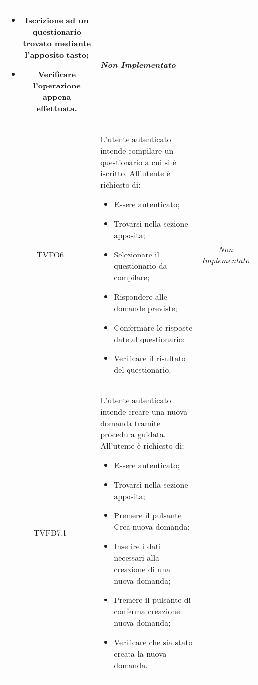 \begin{longtable}[ht]{|c|>{}m{8cm}|c|}
\begin{itemize}
\item Iscrizione ad un questionario trovato mediante l’apposito tasto;
\item Verificare l'operazione appena effettuata.
\end{itemize}
 & \textit{Non Implementato}\\ \hline
\hypertarget{TVFO6}{TVFO6} & L’utente autenticato  intende compilare un questionario a cui si è  iscritto. All’utente è richiesto di:
\begin{itemize}
\item Essere autenticato;
\item Trovarsi nella sezione apposita;
\item Selezionare il questionario da compilare;
\item Rispondere alle domande previste;
\item Confermare le risposte date al questionario;
\item Verificare il risultato del questionario.
\end{itemize}
 & \textit{Non Implementato}\\ \hline
\hypertarget{TVFD7.1}{TVFD7.1} & L’utente autenticato intende creare una nuova
domanda tramite procedura guidata. All’utente è richiesto di:
\begin{itemize}
\item Essere autenticato;
\item Trovarsi nella sezione apposita;
\item Premere il pulsante Crea nuova domanda;
\item Inserire i dati necessari alla creazione di una nuova domanda;
\item Premere il pulsante di conferma creazione
nuova domanda;
\item Verificare che sia stato creata la nuova domanda.
\end{itemize}


\end{longtable}

